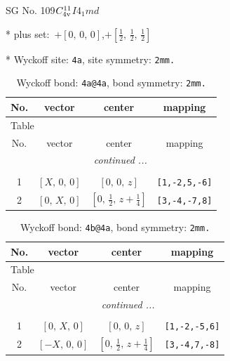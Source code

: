 \documentclass[fleqn,8pt]{jsarticle}
\begin{document}
\setcounter{MaxMatrixCols}{32}

\renewcommand{\tablename}{Table~}
\renewcommand{\figurename}{Figure~}
\begin{center}
\LARGE
SG No. 109\quad$C_{\rm 4v}^{11}$\quad$I4_1md$\quad[ tetragonal ]
\end{center}

* plus set:\,\,\,$+\left[ 0,\, 0,\, 0 \right]$,\quad $+\left[ \frac{1}{2},\, \frac{1}{2},\, \frac{1}{2} \right]$


* Wyckoff site: {\tt 4a}, site symmetry: {\tt 2mm.}
\renewcommand{\arraystretch}{1.2}
\begin{longtable}{cccc}
\caption{Wyckoff bond: {\tt 4a@4a}, bond symmetry: {\tt 2mm.}}
 \\
 \hline \hline
No. & vector & center & mapping \\ \hline \endfirsthead

\multicolumn{3}{l}{\tablename\ \thetable{}} \\
 \hline \hline
No. & vector & center & mapping \\ \hline \endhead

 \hline \hline
\multicolumn{3}{r}{\footnotesize\it continued ...} \\ \endfoot

 \hline \hline
\multicolumn{3}{r}{} \\ \endlastfoot

1 & $\left[ X,\, 0,\, 0 \right]$ & $\left[ 0,\, 0,\, z \right]$ & {\tt [1,-2,5,-6]} \\ \hline
2 & $\left[ 0,\, X,\, 0 \right]$ & $\left[ 0,\, \frac{1}{2},\, z + \frac{1}{4} \right]$ & {\tt [3,-4,-7,8]} \\
\end{longtable}
\renewcommand{\arraystretch}{1.2}
\begin{longtable}{cccc}
\caption{Wyckoff bond: {\tt 4b@4a}, bond symmetry: {\tt 2mm.}}
 \\
 \hline \hline
No. & vector & center & mapping \\ \hline \endfirsthead

\multicolumn{3}{l}{\tablename\ \thetable{}} \\
 \hline \hline
No. & vector & center & mapping \\ \hline \endhead

 \hline \hline
\multicolumn{3}{r}{\footnotesize\it continued ...} \\ \endfoot

 \hline \hline
\multicolumn{3}{r}{} \\ \endlastfoot

1 & $\left[ 0,\, X,\, 0 \right]$ & $\left[ 0,\, 0,\, z \right]$ & {\tt [1,-2,-5,6]} \\ \hline
2 & $\left[ - X,\, 0,\, 0 \right]$ & $\left[ 0,\, \frac{1}{2},\, z + \frac{1}{4} \right]$ & {\tt [3,-4,7,-8]} \\
\end{longtable}
\end{document}
